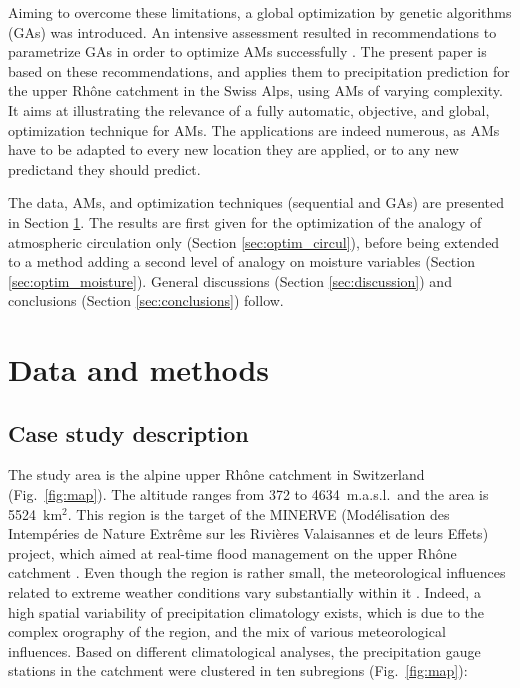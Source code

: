 \documentclass[review]{elsarticle}
\begin{document}
Aiming to overcome these limitations, a global optimization by genetic algorithms (GAs) was introduced. An intensive assessment resulted in recommendations to parametrize GAs in order to optimize AMs successfully \citep{Horton2016}. The present paper is based on these recommendations, and applies them to precipitation prediction for the upper Rh\^{o}ne catchment in the Swiss Alps, using AMs of varying complexity. It aims at illustrating the relevance of a fully automatic, objective, and global, optimization technique for AMs. The applications are indeed numerous, as AMs have to be adapted to every new location they are applied, or to any new predictand they should predict.

The data, AMs, and optimization techniques (sequential and GAs) are presented in Section \ref{sec:data_methods}. The results are first given for the optimization of the analogy of atmospheric circulation only (Section \ref{sec:optim_circul}), before being extended to a method adding a second level of analogy on moisture variables (Section \ref{sec:optim_moisture}). General discussions (Section \ref{sec:discussion}) and conclusions (Section \ref{sec:conclusions}) follow.


\section{Data and methods}
\label{sec:data_methods}


\subsection{Case study description}
\label{sec:case_study}

The study area is the alpine upper Rh\^{o}ne catchment in Switzerland (Fig.\ \ref{fig:map}). The altitude ranges from 372 to 4634~m.a.s.l.\ and the area is 5524~km$^{2}$. This region is the target of the MINERVE (Mod\'{e}lisation des Intemp\'{e}ries de Nature Extr\^{e}me sur les Rivi\`{e}res Valaisannes et de leurs Effets) project, which aimed at real-time flood management on the upper Rh\^{o}ne catchment \citep{GarciaHernandez2009b}. Even though the region is rather small, the meteorological influences related to extreme weather conditions vary substantially within it \citep[see][]{Horton2012}. Indeed, a high spatial variability of precipitation climatology exists, which is due to the complex orography of the region, and the mix of various meteorological influences. Based on different climatological analyses, the precipitation gauge stations in the catchment were clustered in ten subregions (Fig.\ \ref{fig:map}):
\end{document}
